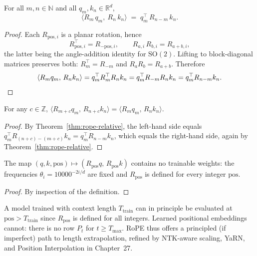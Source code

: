 \begin{theorem}
\label{thm:rope-relative}
For all $m, n \in \mathbb{N}$ and all $q_m, k_n \in \mathbb{R}^d$,
\[
\big\langle R_m\, q_m,\ R_n\, k_n \big\rangle \;=\; q_m^{\top}\, R_{n - m}\, k_n.
\]
\end{theorem}

\begin{proof}
Each $R_{\mathrm{pos}, i}$ is a planar rotation, hence
\[
R_{\mathrm{pos}, i}^{\top} = R_{-\mathrm{pos}, i}, \qquad R_{a, i}\, R_{b, i} = R_{a + b, i},
\]
the latter being the angle-addition identity for $\mathrm{SO}(2)$. Lifting to block-diagonal matrices preserves both: $R_m^{\top} = R_{-m}$ and $R_a R_b = R_{a+b}$. Therefore
\[
\langle R_m q_m,\, R_n k_n \rangle
= q_m^{\top} R_m^{\top} R_n k_n
= q_m^{\top} R_{-m} R_n k_n
= q_m^{\top} R_{n - m} k_n. \qedhere
\]
\end{proof}

\begin{corollary}
\label{cor:translation-invariance}
For any $c \in \mathbb{Z}$, $\langle R_{m+c} q_m,\, R_{n+c} k_n \rangle = \langle R_m q_m,\, R_n k_n \rangle$.
\end{corollary}

\begin{proof}
By Theorem~\ref{thm:rope-relative}, the left-hand side equals $q_m^{\top} R_{(n+c)-(m+c)} k_n = q_m^{\top} R_{n-m} k_n$, which equals the right-hand side, again by Theorem~\ref{thm:rope-relative}.
\end{proof}

\begin{proposition}
The map $(q, k, \mathrm{pos}) \mapsto (R_{\mathrm{pos}} q,\, R_{\mathrm{pos}} k)$ contains no trainable weights: the frequencies $\theta_i = 10000^{-2i/d}$ are fixed and $R_{\mathrm{pos}}$ is defined for every integer $\mathrm{pos}$.
\end{proposition}

\begin{proof}
By inspection of the definition.
\end{proof}

\begin{remark}
A model trained with context length $T_{\mathrm{train}}$ can in principle be evaluated at $\mathrm{pos} > T_{\mathrm{train}}$ since $R_{\mathrm{pos}}$ is defined for all integers. Learned positional embeddings cannot: there is no row $P_t$ for $t \geq T_{\max}$. RoPE thus offers a principled (if imperfect) path to length extrapolation, refined by NTK-aware scaling, YaRN, and Position Interpolation in Chapter~27.
\end{remark}


